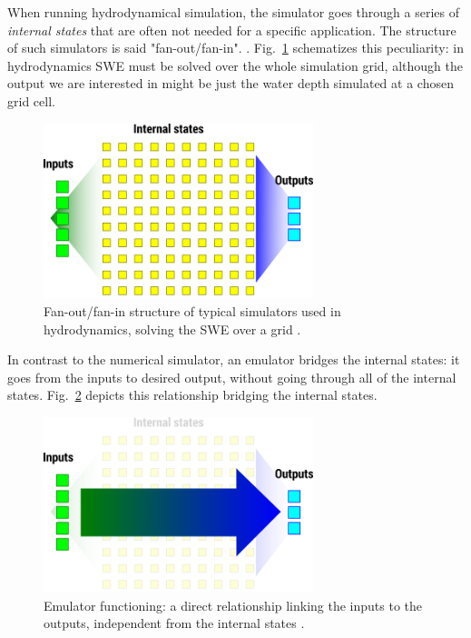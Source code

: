 When running hydrodynamical simulation, the simulator goes through a series of \emph{internal states} that are often not needed for a specific application. The structure of such simulators is said "fan-out/fan-in". \autocite{carbajal_emumore_2017}. Fig.~\ref{fig:simulation} schematizes this peculiarity: in hydrodynamics SWE must be solved over the whole simulation grid, although the output we are interested in might be just the water depth simulated at a chosen grid cell.

\begin{figure}[h]
  \centering
  \includegraphics[width=0.7\textwidth]{Figures/simulation.png}
  \caption{Fan-out/fan-in structure of typical simulators used in hydrodynamics, solving the SWE over a grid \autocite{carbajal_emumore_2017}.}
  \label{fig:simulation}
\end{figure}

In contrast to the numerical simulator, an emulator bridges the internal states: it goes from the inputs to desired output, without going through all of the internal states.  Fig.~\ref{fig:emulation} depicts this relationship bridging the internal states.

\begin{figure}[h]
  \centering
  \includegraphics[width=0.7\textwidth]{Figures/emulation.png}
  \caption{Emulator functioning: a direct relationship linking the inputs to the outputs, independent from the internal states \autocite{carbajal_emumore_2017}.}
  \label{fig:emulation}
\end{figure}

